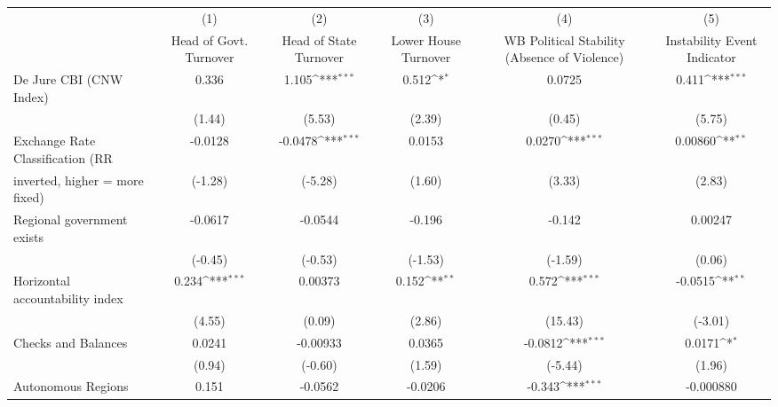 {
\def\sym#1{\ifmmode^{#1}\else\(^{#1}\)\fi}
\begin{tabular}{l*{5}{c}}
\toprule
                                        &\multicolumn{1}{c}{(1)}&\multicolumn{1}{c}{(2)}&\multicolumn{1}{c}{(3)}&\multicolumn{1}{c}{(4)}&\multicolumn{1}{c}{(5)}\\
                                        &\multicolumn{1}{c}{Head of Govt. Turnover}&\multicolumn{1}{c}{Head of State Turnover}&\multicolumn{1}{c}{Lower House Turnover}&\multicolumn{1}{c}{WB Political Stability (Absence of Violence)}&\multicolumn{1}{c}{Instability Event Indicator}\\
\midrule
De Jure CBI (CNW Index)                 &     0.336         &     1.105\sym{***}&     0.512\sym{*}  &    0.0725         &     0.411\sym{***}\\
                                        &    (1.44)         &    (5.53)         &    (2.39)         &    (0.45)         &    (5.75)         \\
\addlinespace
Exchange Rate Classification (RR        &   -0.0128         &   -0.0478\sym{***}&    0.0153         &    0.0270\sym{***}&   0.00860\sym{**} \\
inverted, higher = more fixed)          &   (-1.28)         &   (-5.28)         &    (1.60)         &    (3.33)         &    (2.83)         \\
\addlinespace
Regional government exists              &   -0.0617         &   -0.0544         &    -0.196         &    -0.142         &   0.00247         \\
                                        &   (-0.45)         &   (-0.53)         &   (-1.53)         &   (-1.59)         &    (0.06)         \\
\addlinespace
Horizontal accountability index         &     0.234\sym{***}&   0.00373         &     0.152\sym{**} &     0.572\sym{***}&   -0.0515\sym{**} \\
                                        &    (4.55)         &    (0.09)         &    (2.86)         &   (15.43)         &   (-3.01)         \\
\addlinespace
Checks and Balances                     &    0.0241         &  -0.00933         &    0.0365         &   -0.0812\sym{***}&    0.0171\sym{*}  \\
                                        &    (0.94)         &   (-0.60)         &    (1.59)         &   (-5.44)         &    (1.96)         \\
\addlinespace
Autonomous Regions                      &     0.151         &   -0.0562         &   -0.0206         &    -0.343\sym{***}& -0.000880         \\

\end{tabular}}
